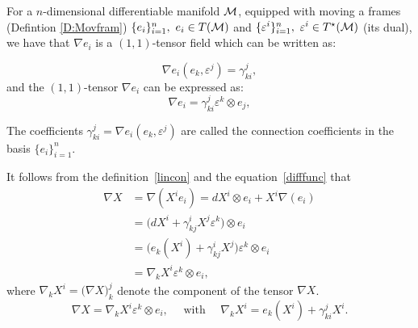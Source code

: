 For a $n$-dimensional differentiable manifold $\mathcal{M}$, equipped with moving a frames (Defintion \ref{D:Movfram}) $\{e_{i}\}_{i=1}^{n},\ e_{i}\in T(\mathcal{M})$  and 
$\{\varepsilon^{{i}}\}_{i=1}^{n},\ \varepsilon^{i}\in T^{\star}(\cM)$ (its dual), 
we have that $\nabla e_{i}$ is a $(1,1)$-tensor field which can be written as: 

\begin{equation} 
\nabla e_{i}(e_{k},\varepsilon^{j})=\gamma^{j}_{ki}, \end{equation}
and the $(1,1)$-tensor $\nabla e_{i}$ can be expressed as:
\begin{equation}\label{E:concoef0}
\nabla e_{i}=\gamma^{j}_{ki} \varepsilon^{k}\otimes e_{j},
\end{equation}

\begin{definition}
The coefficients $\gamma^{j}_{ki}=\nabla e_{i}(e_{k},\varepsilon^{j})$ are called the connection coefficients in the basis $\{e_{i}\}_{i=1}^{n}$.
\end{definition}

It follows from the definition~\ref{lincon} and the equation~\eqref{difffunc} that 
\[\begin{aligned}
\nabla X &= \nabla(X^{i}e_{i})=dX^{i}\otimes e_{i}+X^{i}\nabla(e_{i})\\
&=\big(dX^{i} +\gamma^{i}_{kj} X^{j}\varepsilon^{k}\big) \otimes e_{i}\\
&=\big(e_{k}(X^{i}) +\gamma^{i}_{kj}X^{j} \big) \varepsilon^{k}\otimes e_{i}\\
&=\nabla_{k}X^{i}\varepsilon^{k}\otimes e_{i},
\end{aligned}\]
where  $\nabla_{k}X^{i}=\big (\nabla X \big)^{j}_{k}$ denote the component  of the tensor $\nabla X$.
\begin{equation}\label{concoef1}
\nabla X = \nabla_{k}X^{i}\varepsilon^{k}\otimes e_{i},\quad \text{ with } \quad\nabla_{k}X^{i}=e_{k}(X^{i}) +\gamma^{j}_{ki}X^{i}.
\end{equation}

